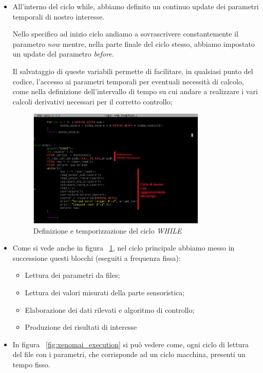 \begin{itemize}
\begin{itemize}
		\item All'interno del ciclo while, abbiamo definito un continuo update dei parametri temporali di nostro interesse.
		
		Nello specifico ad inizio ciclo andiamo a sovrascrivere constantemente il parametro \textit{now} mentre, nella parte finale del ciclo stesso, abbiamo impostato un update del parametro \textit{before}.
		
		Il salvataggio di queste variabili permette di facilitare, in qualsiasi punto del codice, l'accesso ai parametri temporali per eventuali necessità di calcolo, come nella definizione dell'intervallo di tempo su cui andare a realizzare i vari calcoli derivativi necessari per il corretto controllo;
		\begin{figure}[H]
			\centering   	
			\includegraphics[width=0.8\textwidth]{Immagini/xenomai_nano.png}
			\caption{Definizione e temporizzazione del ciclo \textit{WHILE}}
			\label{fig:xenomai_nano}
		\end{figure}
		\item Come si vede anche in figura ~\ref{fig:xenomai_nano}, nel ciclo principale abbiamo messo in successione questi blocchi (eseguiti a frequenza fissa): 
		\begin{itemize}
			\item Lettura dei parametri da files;
			\item Lettura dei valori misurati della parte sensoristica;
			\item Elaborazione dei dati rilevati e algoritmo di controllo;
			\item Produzione dei risultati di interesse
		\end{itemize}
		\item In figura ~\ref{fig:xenomai_execution} si può vedere come, ogni ciclo di lettura del file con i parametri, che corrisponde ad un ciclo macchina, presenti un tempo fisso.
		

\end{itemize}
\end{itemize}
